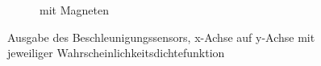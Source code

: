 \begin{landscape}
\begin{figure}[htb]
\begin{subfigure}[c]{.45\linewidth}
				\caption{mit Magneten}
			\end{subfigure}
		\caption{Ausgabe des Beschleunigungssensors, x-Achse auf y-Achse mit jeweiliger Wahrscheinlichkeitsdichtefunktion} \label{Acc}
	\end{figure}
\end{landscape}